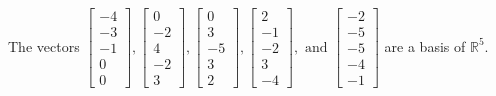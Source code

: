 \begin{exercise}
\begin{exerciseStatement}
  \end{exerciseStatement}
  \begin{exerciseAnswer}
   The vectors \(\left[\begin{array}{r}
-4 \\
-3 \\
-1 \\
0 \\
0
\end{array}\right] , \left[\begin{array}{r}
0 \\
-2 \\
4 \\
-2 \\
3
\end{array}\right] , \left[\begin{array}{r}
0 \\
3 \\
-5 \\
3 \\
2
\end{array}\right] , \left[\begin{array}{r}
2 \\
-1 \\
-2 \\
3 \\
-4
\end{array}\right] , \text{ and } \left[\begin{array}{r}
-2 \\
-5 \\
-5 \\
-4 \\
-1
\end{array}\right]\) 
  	 are  a basis of \(\mathbb{R}^5\).
  


  \end{exerciseAnswer}
\end{exercise}